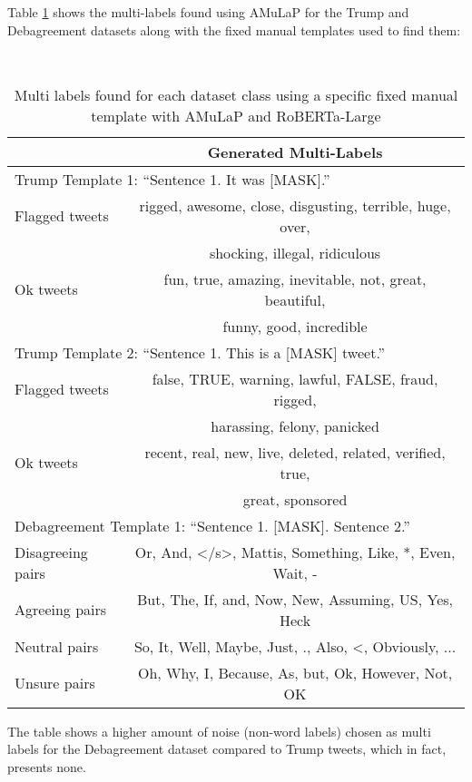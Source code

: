 Table \ref{table:multilabels} shows the multi-labels found using AMuLaP for the Trump and Debagreement datasets along with the fixed manual templates used to find them:

\begin{table}[h!]
    \centering
    \
    \begin{tabular}{|l|c|}
        \hline & Generated Multi-Labels \\
        \hline
        \multicolumn{2}{|l|}{Trump Template 1: ``Sentence 1. It was [MASK].''}\\
        \hline
        Flagged tweets & rigged, awesome, close, disgusting, terrible, huge, over,
        \\ & shocking, illegal, ridiculous \\
        Ok tweets & fun, true, amazing, inevitable, not, great, beautiful,
        \\ & funny, good, incredible \\
        \hline
        \multicolumn{2}{|l|}{Trump Template 2: ``Sentence 1. This is a [MASK] tweet.''}\\
        \hline
        Flagged tweets & false, TRUE, warning, lawful, FALSE, fraud, rigged, 
        \\ & harassing, felony, panicked \\
        Ok tweets & recent, real, new, live, deleted, related, verified, true,
        \\ & great, sponsored  \\
        \hline
        \multicolumn{2}{|l|}{Debagreement Template 1: ``Sentence 1. [MASK]. Sentence 2.''}\\
        \hline
        Disagreeing pairs & Or, And, </s>, Mattis, Something, Like, *, Even, Wait, - \\
        Agreeing pairs & But, The, If, and, Now, New, Assuming, US, Yes, Heck \\
        Neutral pairs & So, It, Well, Maybe, Just, ., Also, <, Obviously, ...  \\
        Unsure pairs & Oh, Why, I, Because, As, but, Ok, However, Not, OK \\
        \hline
    \end{tabular}
    \caption{Multi labels found for each dataset class using a specific fixed manual template with AMuLaP and RoBERTa-Large}
    \label{table:multilabels}
\end{table}

The table shows a higher amount of noise (non-word labels) chosen as multi labels for the Debagreement dataset compared to Trump tweets, which in fact, presents none.


